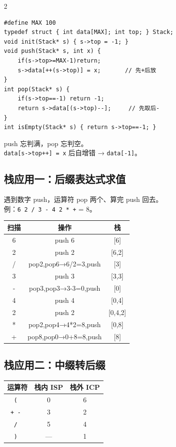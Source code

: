 \documentclass[10pt,a4paper]{article}
\begin{document}
\begin{multicols}{2}
\begin{lstlisting}
#define MAX 100
typedef struct { int data[MAX]; int top; } Stack;
void init(Stack* s) { s->top = -1; }
void push(Stack* s, int x) {
    if(s->top>=MAX-1)return;
    s->data[++(s->top)] = x;       // 先+后放
}
int pop(Stack* s) {
    if(s->top==-1) return -1;
    return s->data[(s->top)--];     // 先取后-
}
int isEmpty(Stack* s) { return s->top==-1; }
\end{lstlisting}

\begin{bugbox}
push 忘判满，pop 忘判空。\\
\texttt{data[s->top++] = x} 后自增错 → \texttt{data[-1]}。
\end{bugbox}

\subsection*{栈应用一：后缀表达式求值}

遇到数字 push，运算符 pop 两个、算完 push 回去。\\
例：\texttt{6 2 / 3 - 4 2 * +} = 8。

\begin{tabular}{|c|c|c|}
\hline
\textbf{扫描} & \textbf{操作} & \textbf{栈} \\
\hline
6 & push 6 & [6] \\
2 & push 2 & [6,2] \\
/ & pop2,pop6→6/2=3,push & [3] \\
3 & push 3 & [3,3] \\
- & pop3,pop3→3-3=0,push & [0] \\
4 & push 4 & [0,4] \\
2 & push 2 & [0,4,2] \\
* & pop2,pop4→4*2=8,push & [0,8] \\
+ & pop8,pop0→0+8=8,push & [8] \\
\hline
\end{tabular}

\subsection*{栈应用二：中缀转后缀}

\begin{center}
\begin{tabular}{|c|c|c|}
\hline
\textbf{运算符} & \textbf{栈内 ISP} & \textbf{栈外 ICP} \\
\hline
\tt ( & 0 & 6 \\
\tt + - & 3 & 2 \\
\tt * / & 5 & 4 \\
\tt ) & — & 1 \\
\hline
\end{tabular}
\end{center}


\end{multicols}
\end{document}
